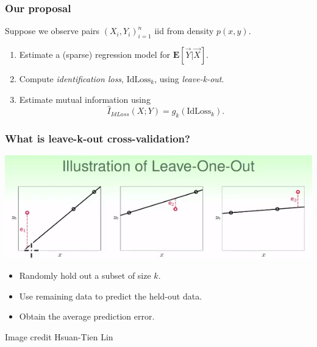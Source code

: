 \documentclass{beamer}
\newcommand{\E}{\textbf{E}}
\begin{document}
\begin{frame}
\frametitle{Our proposal}
Suppose we observe pairs $(X_i,Y_i)_{i=1}^n$ iid from density $p(x, y)$.
\begin{enumerate}
\item Estimate a (sparse) regression model for $\E[\vec{Y}|\vec{X}]$.
\item Compute \emph{identification loss}, $\text{IdLoss}_k$, using \emph{leave-k-out}.
\item Estimate mutual information using
\[
\hat{I}_{IdLoss}(X; Y) = g_k(\text{IdLoss}_k).
\]
\end{enumerate}
\end{frame}

\begin{frame}
\frametitle{What is leave-k-out cross-validation?}
\begin{center}
\includegraphics[scale = 0.5]{loocv_sub.png}
\end{center}
\begin{itemize}
\item Randomly hold out a subset of size $k$.
\item Use remaining data to predict the held-out data.
\item Obtain the average prediction error.
\end{itemize}

{\tiny Image credit Hsuan-Tien Lin}
\end{frame}

\end{document}
